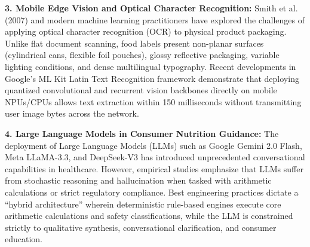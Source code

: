 \documentclass[12pt]{article}
\begin{document}
\noindent
\textbf{3. Mobile Edge Vision and Optical Character Recognition:}
Smith et al. (2007) and modern machine learning practitioners have explored the challenges of applying optical character recognition (OCR) to physical product packaging. Unlike flat document scanning, food labels present non-planar surfaces (cylindrical cans, flexible foil pouches), glossy reflective packaging, variable lighting conditions, and dense multilingual typography. Recent developments in Google's ML Kit Latin Text Recognition framework demonstrate that deploying quantized convolutional and recurrent vision backbones directly on mobile NPUs/CPUs allows text extraction within 150 milliseconds without transmitting user image bytes across the network.

\vspace{0.3cm}

\noindent
\textbf{4. Large Language Models in Consumer Nutrition Guidance:}
The deployment of Large Language Models (LLMs) such as Google Gemini 2.0 Flash, Meta LLaMA-3.3, and DeepSeek-V3 has introduced unprecedented conversational capabilities in healthcare. However, empirical studies emphasize that LLMs suffer from stochastic reasoning and hallucination when tasked with arithmetic calculations or strict regulatory compliance. Best engineering practices dictate a ``hybrid architecture'' wherein deterministic rule-based engines execute core arithmetic calculations and safety classifications, while the LLM is constrained strictly to qualitative synthesis, conversational clarification, and consumer education.

\vspace{0.5cm}
\end{document}
